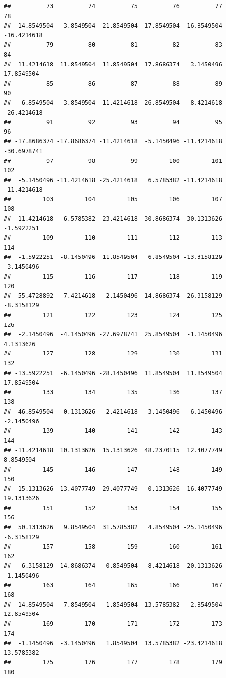\documentclass[
]{book}
\begin{document}
\begin{verbatim}
##          73          74          75          76          77          78 
##  14.8549504   3.8549504  21.8549504  17.8549504  16.8549504 -16.4214618 
##          79          80          81          82          83          84 
## -11.4214618  11.8549504  11.8549504 -17.8686374  -3.1450496  17.8549504 
##          85          86          87          88          89          90 
##   6.8549504   3.8549504 -11.4214618  26.8549504  -8.4214618 -26.4214618 
##          91          92          93          94          95          96 
## -17.8686374 -17.8686374 -11.4214618  -5.1450496 -11.4214618 -30.6978741 
##          97          98          99         100         101         102 
##  -5.1450496 -11.4214618 -25.4214618   6.5785382 -11.4214618 -11.4214618 
##         103         104         105         106         107         108 
## -11.4214618   6.5785382 -23.4214618 -30.8686374  30.1313626  -1.5922251 
##         109         110         111         112         113         114 
##  -1.5922251  -8.1450496  11.8549504   6.8549504 -13.3158129  -3.1450496 
##         115         116         117         118         119         120 
##  55.4728892  -7.4214618  -2.1450496 -14.8686374 -26.3158129  -8.3158129 
##         121         122         123         124         125         126 
##  -2.1450496  -4.1450496 -27.6978741  25.8549504  -1.1450496   4.1313626 
##         127         128         129         130         131         132 
## -13.5922251  -6.1450496 -28.1450496  11.8549504  11.8549504  17.8549504 
##         133         134         135         136         137         138 
##  46.8549504   0.1313626  -2.4214618  -3.1450496  -6.1450496  -2.1450496 
##         139         140         141         142         143         144 
## -11.4214618  10.1313626  15.1313626  48.2370115  12.4077749   8.8549504 
##         145         146         147         148         149         150 
##  15.1313626  13.4077749  29.4077749   0.1313626  16.4077749  19.1313626 
##         151         152         153         154         155         156 
##  50.1313626   9.8549504  31.5785382   4.8549504 -25.1450496  -6.3158129 
##         157         158         159         160         161         162 
##  -6.3158129 -14.8686374   0.8549504  -8.4214618  20.1313626  -1.1450496 
##         163         164         165         166         167         168 
##  14.8549504   7.8549504   1.8549504  13.5785382   2.8549504  12.8549504 
##         169         170         171         172         173         174 
##  -1.1450496  -3.1450496   1.8549504  13.5785382 -23.4214618  13.5785382 
##         175         176         177         178         179         180 

\end{verbatim}
\end{document}

